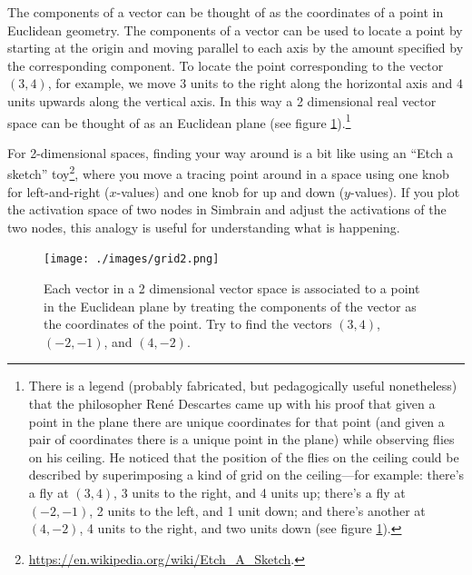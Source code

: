    The components of a vector can be thought of as the coordinates of a point
in Euclidean geometry. The components of a vector can be used to locate a
point by starting at the origin and moving parallel to each axis by the 
amount specified by the corresponding component. To locate the point corresponding to the vector 
$(3,4)$, for example, we move $3$ units to the right along the 
horizontal axis and $4$ units upwards along the vertical axis. In this way a 
2 dimensional real vector space can be thought of as an Euclidean plane (see 
figure \ref{2d}).\footnote{There is a legend (probably fabricated, but pedagogically useful nonetheless) 
that the philosopher Ren{\'{e}} Descartes 
 came up with his proof that given a point in the plane there are unique coordinates for that 
 point (and given a pair of coordinates there is a unique point in the plane) 
 while observing flies on his ceiling. He 
 noticed that the position of the flies on the ceiling could be described by 
 superimposing a kind of grid on the ceiling---for example: there's a fly at 
 $(3,4)$, 3 units to the right, and 4 units up; there's a fly at 
 $(-2,-1)$, 2 units to the left, and 1 unit down; and there's another at 
 $(4,-2)$, 4 units to the right, and two units down (see figure \ref{2d}).} 
 
For 2-dimensional spaces, finding your way around is a bit like using an ``Etch a sketch'' toy\footnote{\url{https://en.wikipedia.org/wiki/Etch_A_Sketch}.}, where you move a tracing point around in a space using one knob for left-and-right ($x$-values) and one knob for up and down ($y$-values). If you plot the activation space of two nodes in Simbrain and adjust the activations of the two nodes, this analogy is useful for understanding what is happening.

\begin{figure}[h]
\centering
\texttt{[image: ./images/grid2.png]}
\caption[Scott Hotton.]{Each vector in a 2 dimensional vector space is associated to a point 
in the Euclidean plane by treating the components of the vector as the 
coordinates of the point. Try to find the vectors $(3,4)$, $(-2,-1)$, and 
$(4,-2)$.} 
\label{2d}
\end{figure}

